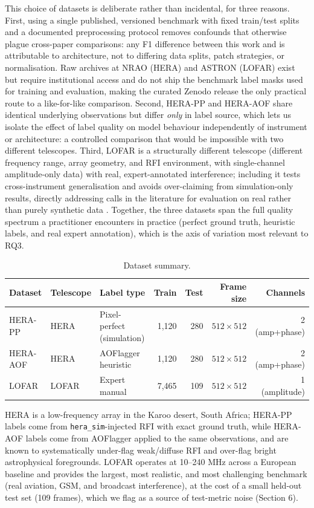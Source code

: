 \documentclass[11pt]{article}
\begin{document}
This choice of datasets is deliberate rather than incidental, for three reasons. First, using a single published, versioned benchmark with fixed train/test splits and a documented preprocessing protocol removes confounds that otherwise plague cross-paper comparisons: any F1 difference between this work and \citet{dutoit2023} is attributable to architecture, not to differing data splits, patch strategies, or normalisation. Raw archives at NRAO (HERA) and ASTRON (LOFAR) exist but require institutional access and do not ship the benchmark label masks used for training and evaluation, making the curated Zenodo release the only practical route to a like-for-like comparison. Second, HERA-PP and HERA-AOF share identical underlying observations but differ \emph{only} in label source, which lets us isolate the effect of label quality on model behaviour independently of instrument or architecture: a controlled comparison that would be impossible with two different telescopes. Third, LOFAR is a structurally different telescope (different frequency range, array geometry, and RFI environment, with single-channel amplitude-only data) with real, expert-annotated interference; including it tests cross-instrument generalisation and avoids over-claiming from simulation-only results, directly addressing calls in the literature for evaluation on real rather than purely synthetic data \citep{liang2023}. Together, the three datasets span the full quality spectrum a practitioner encounters in practice (perfect ground truth, heuristic labels, and real expert annotation), which is the axis of variation most relevant to RQ3.

\begin{table}[h]
\centering
\caption{Dataset summary.}
\begin{tabular}{lllrrrr}
\toprule
Dataset & Telescope & Label type & Train & Test & Frame size & Channels \\
\midrule
HERA-PP & HERA & Pixel-perfect (simulation) & 1,120 & 280 & $512\times512$ & 2 (amp+phase) \\
HERA-AOF & HERA & AOFlagger heuristic & 1,120 & 280 & $512\times512$ & 2 (amp+phase) \\
LOFAR & LOFAR & Expert manual & 7,465 & 109 & $512\times512$ & 1 (amplitude) \\
\bottomrule
\end{tabular}
\end{table}

HERA \citep{deboer2017} is a low-frequency array in the Karoo desert, South Africa; HERA-PP labels come from \texttt{hera\_sim}-injected RFI with exact ground truth, while HERA-AOF labels come from AOFlagger applied to the same observations, and are known to systematically under-flag weak/diffuse RFI and over-flag bright astrophysical foregrounds. LOFAR \citep{vanhaarlem2013} operates at 10--240 MHz across a European baseline and provides the largest, most realistic, and most challenging benchmark (real aviation, GSM, and broadcast interference), at the cost of a small held-out test set (109 frames), which we flag as a source of test-metric noise (Section 6).
\end{document}
